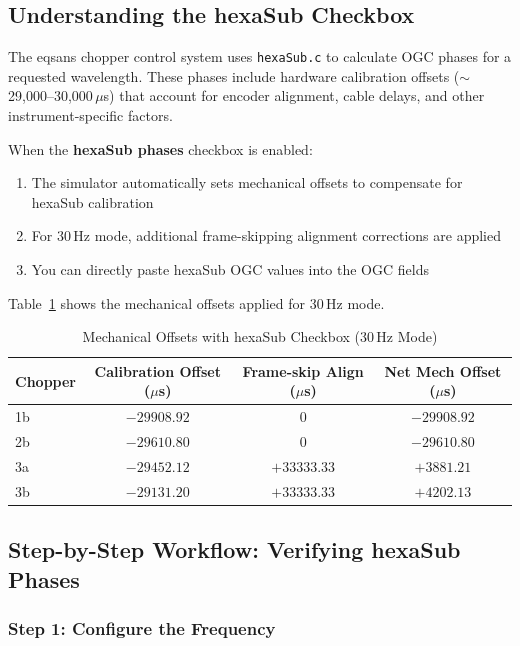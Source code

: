 \documentclass[tm]{ornltm}
\begin{document}
\subsection{Understanding the hexaSub Checkbox}

The \ac{eqsans} chopper control system uses \texttt{hexaSub.c} to calculate OGC phases for a requested wavelength. These phases include hardware calibration offsets ($\sim$29,000--30,000\,$\mu$s) that account for encoder alignment, cable delays, and other instrument-specific factors.

When the \textbf{hexaSub phases} checkbox is enabled:
\begin{enumerate}
    \item The simulator automatically sets mechanical offsets to compensate for hexaSub calibration
    \item For 30\,Hz mode, additional frame-skipping alignment corrections are applied
    \item You can directly paste hexaSub OGC values into the OGC fields
\end{enumerate}

Table~\ref{tab:hexasub_offsets} shows the mechanical offsets applied for 30\,Hz mode.

\begin{table}[ht]
\centering

\caption{Mechanical Offsets with hexaSub Checkbox (30\,Hz Mode)}
\label{tab:hexasub_offsets}
\begin{tabular}{lccc}
\toprule
Chopper & Calibration Offset ($\mu$s) & Frame-skip Align ($\mu$s) & Net Mech Offset ($\mu$s) \\
\midrule
1b & $-29908.92$ & $0$ & $-29908.92$ \\
2b & $-29610.80$ & $0$ & $-29610.80$ \\
3a & $-29452.12$ & $+33333.33$ & $+3881.21$ \\
3b & $-29131.20$ & $+33333.33$ & $+4202.13$ \\
\bottomrule
\end{tabular}

\end{table}

\subsection{Step-by-Step Workflow: Verifying hexaSub Phases}

\subsubsection{Step 1: Configure the Frequency}
\end{document}
